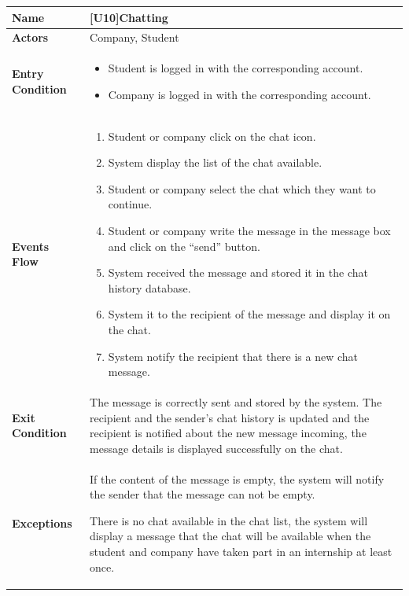 \begin{center}
    \begin{tabular}{|p{9em}|p{27em}|}
        \hline
        \rowcolor{bluepoli!40} %
        \textbf{Name} & \textbf{[U10]Chatting} \\
        \hline
        \textbf{Actors} & Company, Student\\
        \hline
        \textbf{Entry Condition} & 
        \begin{itemize}
            \item Student is logged in with the corresponding account.
            \item Company is logged in with the corresponding account.
        \end{itemize} \\
        \hline
        \textbf{Events Flow} & 
        \begin{enumerate}
            \item Student or company click on the chat icon.
            \item System display the list of the chat available.
            \item Student or company select the chat which they want to continue.
            \item Student or company write the message in the message box and click on the ``send'' button.
            \item System received the message and stored it in the chat history database.
            \item System it to the recipient of the message and display it on the chat.
            \item System notify the recipient that there is a new chat message.
        \end{enumerate} \\
        \hline
        \textbf{Exit Condition} & 
         The message is correctly sent and stored by the system. The recipient and the sender's chat history is updated and the recipient is
         notified about the new message incoming, the message details is displayed successfully on the chat.\\
        \hline
        \textbf{Exceptions} &
         If the content of the message is empty, the system will notify the sender that the message can not be empty.

         There is no chat available in the chat list, the system will display a message that the chat will be available when the student and 
         company have taken part in an internship at least once.\\
        \hline
    \end{tabular}
\end{center}

